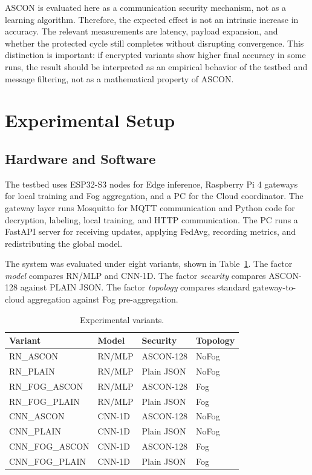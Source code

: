 \documentclass[runningheads]{llncs}
\begin{document}
ASCON is evaluated here as a communication security mechanism, not as a learning algorithm. Therefore, the expected effect is not an intrinsic increase in accuracy. The relevant measurements are latency, payload expansion, and whether the protected cycle still completes without disrupting convergence. This distinction is important: if encrypted variants show higher final accuracy in some runs, the result should be interpreted as an empirical behavior of the testbed and message filtering, not as a mathematical property of ASCON.

\section{Experimental Setup}

\subsection{Hardware and Software}

The testbed uses ESP32-S3 nodes for Edge inference, Raspberry Pi 4 gateways for local training and Fog aggregation, and a PC for the Cloud coordinator. The gateway layer runs Mosquitto for MQTT communication and Python code for decryption, labeling, local training, and HTTP communication. The PC runs a FastAPI server for receiving updates, applying FedAvg, recording metrics, and redistributing the global model.

The system was evaluated under eight variants, shown in Table~\ref{tab:variants}. The factor \emph{model} compares RN/MLP and CNN-1D. The factor \emph{security} compares ASCON-128 against PLAIN JSON. The factor \emph{topology} compares standard gateway-to-cloud aggregation against Fog pre-aggregation.

\begin{table}[t]
\centering
\caption{Experimental variants.}
\label{tab:variants}
\begin{tabular}{llll}
\toprule
Variant & Model & Security & Topology \\
\midrule
RN\_ASCON & RN/MLP & ASCON-128 & NoFog \\
RN\_PLAIN & RN/MLP & Plain JSON & NoFog \\
RN\_FOG\_ASCON & RN/MLP & ASCON-128 & Fog \\
RN\_FOG\_PLAIN & RN/MLP & Plain JSON & Fog \\
CNN\_ASCON & CNN-1D & ASCON-128 & NoFog \\
CNN\_PLAIN & CNN-1D & Plain JSON & NoFog \\
CNN\_FOG\_ASCON & CNN-1D & ASCON-128 & Fog \\
CNN\_FOG\_PLAIN & CNN-1D & Plain JSON & Fog \\
\bottomrule
\end{tabular}
\end{table}
\end{document}
